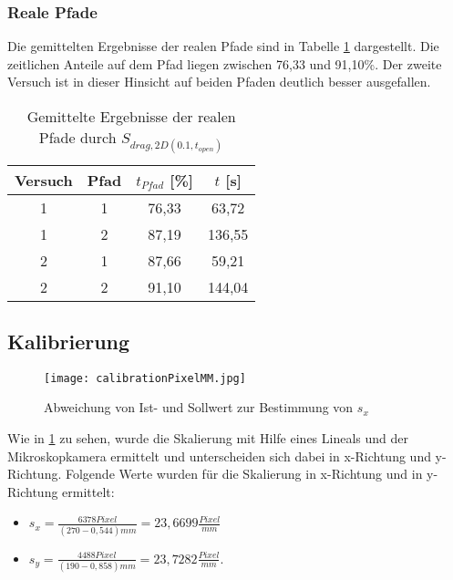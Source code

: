 \subsubsection{Reale Pfade}
Die gemittelten Ergebnisse der realen Pfade sind in Tabelle \ref{table pfad all_rob} dargestellt. Die zeitlichen Anteile auf dem Pfad liegen zwischen 76,33 und 91,10\%. Der zweite Versuch ist in dieser Hinsicht auf beiden Pfaden deutlich besser ausgefallen. 
\begin{table}[h]
	\caption{Gemittelte Ergebnisse der realen Pfade durch $S_{drag,2D(0.1,t_{open})}$}
	\label{table pfad all_rob}
	\begin{center}
		\begin{tabular}{ |c|c|c|c| }
			\hline
			Versuch & Pfad & $t_{Pfad}$ [\%]  & $t$ [s] \\
			\hline
			1 & 1 & 76,33 & 63,72\\
			\hline
			1 & 2 & 87,19 & 136,55\\
			\hline
			2 & 1 & 87,66 & 59,21\\
			\hline
			2 & 2& 91,10 & 144,04\\
			\hline
		\end{tabular}
	\end{center}
\end{table}

\subsection{Kalibrierung}

\begin{figure}[H]
	\centering
	\texttt{[image: calibrationPixelMM.jpg]}
	\caption{Abweichung von Ist- und Sollwert zur Bestimmung von $s_{x}$}
	\label{fig:calibrationPixelMM}
\end{figure}

Wie in \ref{fig:calibrationPixelMM} zu sehen, wurde die Skalierung mit Hilfe eines Lineals und der Mikroskopkamera ermittelt und unterscheiden sich dabei in x-Richtung und y-Richtung. Folgende Werte wurden für die Skalierung in x-Richtung  und in y-Richtung ermittelt:

\begin{itemize}
	\item
	$s_{x}=\frac{6378 Pixel}{(270-0,544)mm}=23,6699\frac{Pixel}{mm}$
	\item
	$s_{y}=\frac{4488 Pixel}{(190-0,858)mm}=23,7282\frac{Pixel}{mm}$.
\end{itemize}	

